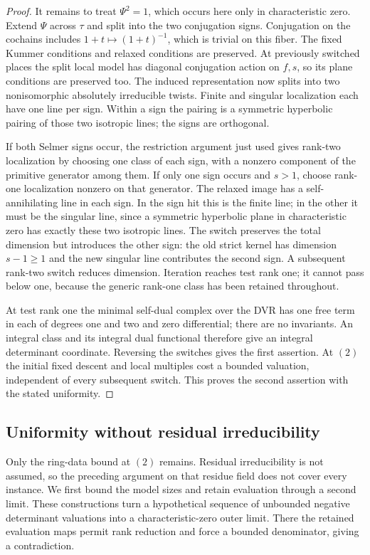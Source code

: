 \begin{proof}
It remains to treat $\Psi^2=1$, which occurs here only in
characteristic zero. Extend $\Psi$ across $\tau$ and split into the
two conjugation signs. Conjugation on the cochains includes
$1+t\mapsto(1+t)^{-1}$, which is trivial on this fiber. The fixed
Kummer conditions and relaxed conditions are preserved. At previously
switched places the split local model has diagonal conjugation action
on $f,s$, so its plane conditions are preserved too. The induced
representation now splits into two nonisomorphic absolutely irreducible
twists. Finite and singular localization each have one line per sign.
Within a sign the pairing is a symmetric hyperbolic pairing of those
two isotropic lines; the signs are orthogonal.

If both Selmer signs occur, the restriction argument just used gives
rank-two localization by choosing one class of each sign, with a
nonzero component of the primitive generator among them. If only one
sign occurs and $s>1$, choose rank-one localization nonzero on that
generator. The relaxed image has a self-annihilating line in each
sign. In the sign hit this is the finite line; in the other it must
be the singular line, since a symmetric hyperbolic plane in
characteristic zero has exactly these two isotropic lines. The switch
preserves the total dimension but introduces the other sign: the old
strict kernel has dimension $s-1\ge1$ and the new singular line
contributes the second sign. A subsequent rank-two switch reduces
dimension. Iteration reaches test rank one; it cannot pass below one,
because the generic rank-one class has been retained throughout.

At test rank one the minimal self-dual complex over the DVR has one
free term in each of degrees one and two and zero differential; there
are no invariants. An integral class and its integral dual functional
therefore give an integral determinant coordinate. Reversing the
switches gives the first assertion. At $(2)$ the initial fixed descent
and local multiples cost a bounded valuation, independent of every
subsequent switch. This proves the second assertion with the stated
uniformity.
\end{proof}

\subsection{Uniformity without residual irreducibility}
\label{sec:h:uniform-ring-bound}

Only the ring-data bound at $(2)$ remains. Residual irreducibility is
not assumed, so the preceding argument on that residue field does not
cover every instance. We first bound the model sizes and retain evaluation through a second
limit. These constructions turn a hypothetical
sequence of unbounded negative determinant valuations into a
characteristic-zero outer limit. There the retained evaluation maps
permit rank reduction and force a bounded denominator, giving a
contradiction.

